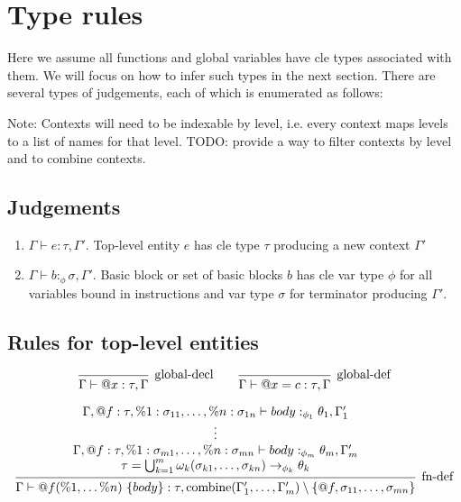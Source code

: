 \documentclass{article}
\begin{document}
\section{Type rules}

Here we assume all functions and global variables have cle types associated with them. We will focus on how to infer such types in the next section. There are several types of judgements, each of which is enumerated as follows:

Note: Contexts will need to be indexable by level, i.e. every context maps levels to a list of names for that level.
TODO: provide a way to filter contexts by level and to combine contexts.

\subsection{Judgements}
\begin{enumerate}
    \item $\Gamma \vdash e : \tau, \Gamma'$. Top-level entity $e$ has cle type $\tau$ producing a new context $\Gamma'$
    \item $\Gamma \vdash b :_\phi \sigma, \Gamma'$. Basic block or set of basic blocks $b$ has cle var type $\phi$ for all variables bound in instructions and var type $\sigma$ for terminator producing $\Gamma'$.
\end{enumerate}

\subsection{Rules for top-level entities}

\[    
\begin{prooftree}
    \infer0[global-decl]{\Gamma \vdash @x : \tau, \Gamma}
\end{prooftree}
\qquad
\begin{prooftree}
    \infer0[global-def]{\Gamma \vdash @x = c : \tau, \Gamma}
\end{prooftree}
\]

\[
\begin{prooftree}
    \hypo{
    \begin{matrix}
        \Gamma, @f : \tau, \%1 : \sigma_{11}, \ldots, \%n: \sigma_{1n} \vdash body :_{\phi_1} \theta_1, \Gamma'_1 \\
        \vdots \\
        \Gamma, @f : \tau, \%1 : \sigma_{m1}, \ldots, \%n: \sigma_{mn} \vdash body :_{\phi_m} \theta_m, \Gamma'_m \\
        \tau = \bigcup_{k=1}^m \omega_k (\sigma_{k1}, \dots, \sigma_{kn}) \rightarrow_{\phi_k} \theta_k
    \end{matrix}
    }
    \infer1[fn-def]{\Gamma \vdash @f(\%1, \dots \%n)\ \{ body \} : \tau, \text{combine}(\Gamma'_1, \dots, \Gamma'_m) \setminus \{ @f, \sigma_{11}, \dots, \sigma_{mn} \}  }
    
\end{prooftree}
\]
\end{document}
